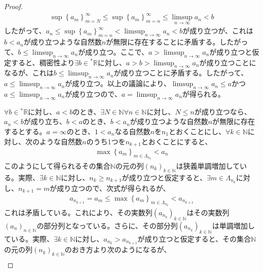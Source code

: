 \documentclass[dvipdfmx]{jsarticle}
\begin{document}
\begin{proof}
\begin{align*}
\sup\left\{ a_{m} \right\}_{m = N}^{\infty} \leq \sup\left\{ a_{m} \right\}_{m = n}^{\infty} \leq \limsup_{n \rightarrow \infty}a_{n} < b
\end{align*}
したがって、$a_{n} \leq \sup\left\{ a_{m} \right\}_{m = n}^{\infty} < \limsup_{n \rightarrow \infty}a_{n} < b$が成り立つが、これは$b < a_{n}$が成り立つような自然数$n$が無限に存在することに矛盾する。したがって、$b \leq \limsup_{n \rightarrow \infty}a_{n}$が成り立つ。ここで、$a > \limsup_{n \rightarrow \infty}a_{n}$が成り立つと仮定すると、稠密性より$\exists b \in{}^{*}\mathbb{R}$に対し、$a > b > \limsup_{n \rightarrow \infty}a_{n}$が成り立つことになるが、これは$b \leq \limsup_{n \rightarrow \infty}a_{n}$が成り立つことに矛盾する。したがって、$a \leq \limsup_{n \rightarrow \infty}a_{n}$が成り立つ。以上の議論により、$\limsup_{n \rightarrow \infty}a_{n} \leq a$かつ$a \leq \limsup_{n \rightarrow \infty}a_{n}$が成り立つので、$a = \limsup_{n \rightarrow \infty}a_{n}$が得られる。\par
$\forall b \in{}^{*}\mathbb{R}$に対し、$a < b$のとき、$\exists N \in \mathbb{N}\forall n \in \mathbb{N}$に対し、$N \leq n$が成り立つなら、$a_{n} < b$が成り立ち、$b < a$のとき、$b < a_{n}$が成り立つような自然数$n$が無限に存在するとする。$a = \infty$のとき、$1 < a_{n}$なる自然数$n$を$n_{1}$とおくことにし、$\forall k \in \mathbb{N}$に対し、次のような自然数$n$のうち1つを$n_{k + 1}$とおくことにすると、
\begin{align*}
\max\left\{ a_{m} \right\}_{m \in \varLambda_{n_{k}}} < a_{n}
\end{align*}
このようにして得られるその集合$\mathbb{N}$の元の列$\left( n_{k} \right)_{k \in \mathbb{N}}$は狭義単調増加している。実際、$\exists k \in \mathbb{N}$に対し、$n_{k} \geq n_{k + 1}$が成り立つと仮定すると、$\exists m \in \varLambda_{n_{k}}$に対し、$n_{k + 1} = m$が成り立つので、次式が得られるが、
\begin{align*}
a_{n_{k + 1}} = a_{m} \leq \max\left\{ a_{m} \right\}_{m \in \varLambda_{n_{k}}} < a_{n_{k + 1}}
\end{align*}
これは矛盾している。これにより、その実数列$\left( a_{n_{k}} \right)_{k \in \mathbb{N}}$はその実数列$\left( a_{n} \right)_{n \in \mathbb{N}}$の部分列となっている。さらに、その部分列$\left( a_{n_{k}} \right)_{k \in \mathbb{N}}$は単調増加している。実際、$\exists k \in \mathbb{N}$に対し、$a_{n_{k}} > a_{n_{k + 1}}$が成り立つと仮定すると、その集合$\mathbb{N}$の元の列$\left( n_{k} \right)_{k \in \mathbb{N}}$のおき方より次のようになるが、
\begin{align*}

\end{align*}
\end{proof}
\end{document}
